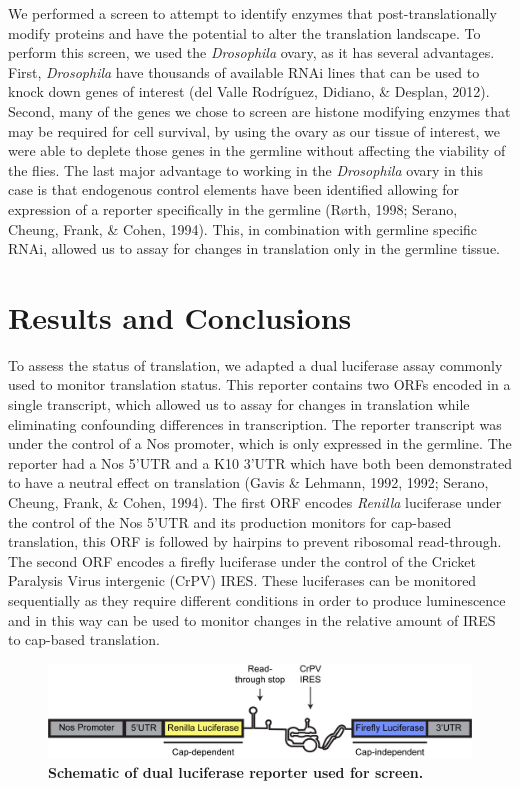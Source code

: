 \documentclass[12pt,oneside]{reedthesis}
\begin{document}
We performed a screen to attempt to identify enzymes that
post-translationally modify proteins and have the potential to alter the
translation landscape. To perform this screen, we used the \emph{Drosophila} ovary, as it has several advantages. First, \emph{Drosophila} have thousands
of available RNAi lines that can be used to knock down genes of interest
(del Valle Rodríguez, Didiano, \& Desplan, 2012). Second, many of the genes we
chose to screen are histone modifying enzymes that may be required for
cell survival, by using the ovary as our tissue of interest, we were
able to deplete those genes in the germline without affecting the
viability of the flies. The last major advantage to working in the
\emph{Drosophila} ovary in this case is that endogenous control elements have
been identified allowing for expression of a reporter specifically in
the germline (Rørth, 1998; Serano, Cheung, Frank, \& Cohen, 1994). This, in combination with
germline specific RNAi, allowed us to assay for changes in translation
only in the germline tissue.

\hypertarget{results-and-conclusions}{%
\section{Results and Conclusions}\label{results-and-conclusions}}

To assess the status of translation, we adapted a dual luciferase assay
commonly used to monitor translation status. This reporter contains two
ORFs encoded in a single transcript, which allowed us to assay for
changes in translation while eliminating confounding differences in
transcription. The reporter transcript was under the control of a Nos
promoter, which is only expressed in the germline. The reporter had a
Nos 5'UTR and a K10 3'UTR which have both been demonstrated to have a
neutral effect on translation (Gavis \& Lehmann, 1992, 1992; Serano, Cheung, Frank, \& Cohen, 1994). The first ORF encodes
\emph{Renilla} luciferase under the control of the Nos 5'UTR and its
production monitors for cap-based translation, this ORF is followed by
hairpins to prevent ribosomal read-through. The second ORF encodes a
firefly luciferase under the control of the Cricket Paralysis Virus
intergenic (CrPV) IRES. These luciferases can be monitored sequentially
as they require different conditions in order to produce luminescence
and in this way can be used to monitor changes in the relative amount of
IRES to cap-based translation.
\begin{figure}

{\centering \includegraphics[width=0.97\linewidth]{./figure/Screen/Construct} 

}

\caption[\textbf{Schematic of dual luciferase reporter used for screen.}]{\textbf{Schematic of dual luciferase reporter used for screen.}}\label{fig:Screen-fig-1}
\end{figure}
\end{document}
